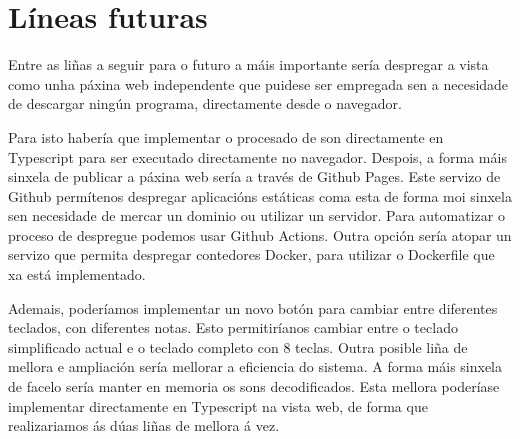 \section{Líneas futuras}
Entre as liñas a seguir para o futuro a máis importante sería despregar a vista como unha páxina web independente que puidese ser empregada sen a necesidade de descargar ningún programa, directamente desde o navegador.

Para isto habería que implementar o procesado de son directamente en Typescript para ser executado directamente no navegador. Despois, a forma máis sinxela de publicar a páxina web sería a través de Github Pages. Este servizo de Github permítenos despregar aplicacións estáticas coma esta de forma moi sinxela sen necesidade de mercar un dominio ou utilizar un servidor. Para automatizar o proceso de despregue podemos usar Github Actions. Outra opción sería atopar un servizo que permita despregar contedores Docker, para utilizar o Dockerfile que xa está implementado.

Ademais, poderíamos implementar un novo botón para cambiar entre diferentes teclados, con diferentes notas. Esto permitiríanos cambiar entre o teclado simplificado actual e o teclado completo con 8 teclas. 
\newline\newline
Outra posible liña de mellora e ampliación sería mellorar a eficiencia do sistema. A forma máis sinxela de facelo sería manter en memoria os sons decodificados. Esta mellora poderíase implementar directamente en Typescript na vista web, de forma que realizariamos ás dúas liñas de mellora á vez.